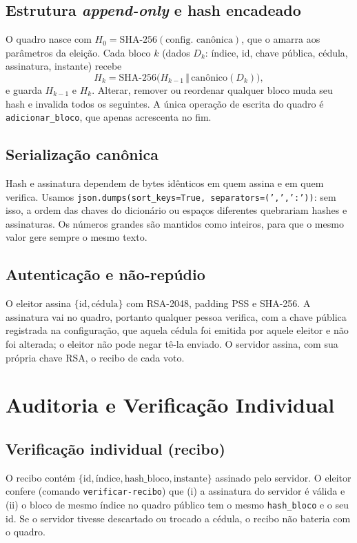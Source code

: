 \documentclass[11pt,a4paper]{article}
\begin{document}
\subsection{Estrutura \emph{append-only} e hash encadeado}
O quadro nasce com $H_0=\text{SHA-256}(\text{config. canônica})$, que o amarra aos parâmetros da eleição. Cada bloco $k$ (dados $D_k$: índice, id, chave pública, cédula, assinatura, instante) recebe
\[
H_k=\text{SHA-256}\bigl(H_{k-1}\,\Vert\,\text{canônico}(D_k)\bigr),
\]
e guarda $H_{k-1}$ e $H_k$. Alterar, remover ou reordenar qualquer bloco muda seu hash e invalida todos os seguintes. A única operação de escrita do quadro é \texttt{adicionar\_bloco}, que apenas acrescenta no fim.

\subsection{Serialização canônica}
Hash e assinatura dependem de bytes idênticos em quem assina e em quem verifica. Usamos \texttt{json.dumps(sort\_keys=True, separators=(',',':'))}: sem isso, a ordem das chaves do dicionário ou espaços diferentes quebrariam hashes e assinaturas. Os números grandes são mantidos como inteiros, para que o mesmo valor gere sempre o mesmo texto.

\subsection{Autenticação e não-repúdio}
O eleitor assina $\{\text{id},\text{cédula}\}$ com RSA-2048, padding PSS e SHA-256. A assinatura vai no quadro, portanto qualquer pessoa verifica, com a chave pública registrada na configuração, que aquela cédula foi emitida por aquele eleitor e não foi alterada; o eleitor não pode negar tê-la enviado. O servidor assina, com sua própria chave RSA, o recibo de cada voto.

\section{Auditoria e Verificação Individual}\label{sec:aud}
\subsection{Verificação individual (recibo)}
O recibo contém $\{\text{id},\text{índice},\text{hash\_bloco},\text{instante}\}$ assinado pelo servidor. O eleitor confere (comando \texttt{verificar-recibo}) que (i) a assinatura do servidor é válida e (ii) o bloco de mesmo índice no quadro público tem o mesmo \texttt{hash\_bloco} e o seu id. Se o servidor tivesse descartado ou trocado a cédula, o recibo não bateria com o quadro.
\end{document}

